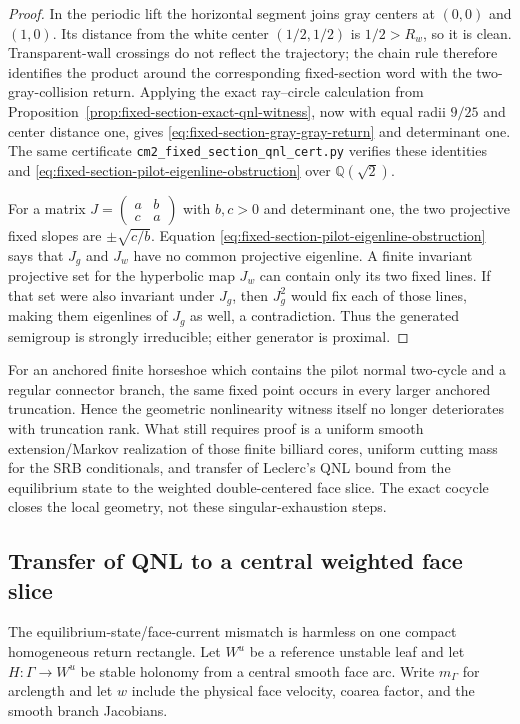 \documentclass[11pt]{article}
\begin{document}
\begin{proof}
In the periodic lift the horizontal segment joins gray centers at $(0,0)$
and $(1,0)$.  Its distance from the white center $(1/2,1/2)$ is $1/2>R_w$,
so it is clean.  Transparent-wall crossings do not reflect the trajectory;
the chain rule therefore identifies the product around the corresponding
fixed-section word with the two-gray-collision return.  Applying the exact
ray--circle calculation from
Proposition~\ref{prop:fixed-section-exact-qnl-witness}, now with equal radii
$9/25$ and center distance one, gives
\eqref{eq:fixed-section-gray-gray-return} and determinant one.  The same
certificate \texttt{cm2\_fixed\_section\_qnl\_cert.py} verifies these
identities and \eqref{eq:fixed-section-pilot-eigenline-obstruction} over
$\mathbb Q(\sqrt2)$.

For a matrix
$J=\left(\begin{smallmatrix}a&b\\c&a\end{smallmatrix}\right)$ with
$b,c>0$ and determinant one, the two projective fixed slopes are
$\pm\sqrt{c/b}$.  Equation
\eqref{eq:fixed-section-pilot-eigenline-obstruction} says that $J_g$ and
$J_w$ have no common projective eigenline.  A finite invariant projective
set for the hyperbolic map $J_w$ can contain only its two fixed lines.  If
that set were also invariant under $J_g$, then $J_g^2$ would fix each of
those lines, making them eigenlines of $J_g$ as well, a contradiction.
Thus the generated semigroup is strongly irreducible; either generator is
proximal.
\end{proof}

For an anchored finite horseshoe which contains the pilot normal two-cycle and a
regular connector branch, the same fixed point occurs in every larger
anchored truncation.  Hence the geometric nonlinearity witness itself no
longer deteriorates with truncation rank.  What still requires proof is a
uniform smooth extension/Markov realization of those finite billiard cores,
uniform cutting mass for the SRB conditionals, and transfer of Leclerc's QNL
bound from the equilibrium state to the weighted double-centered face slice.
The exact cocycle closes the local geometry, not these singular-exhaustion
steps.

\subsection{Transfer of QNL to a central weighted face slice}

The equilibrium-state/face-current mismatch is harmless on one compact
homogeneous return rectangle.  Let $W^u$ be a reference unstable leaf and let
$H:\Gamma\to W^u$ be stable holonomy from a central smooth face arc.  Write
$m_\Gamma$ for arclength and let $w$ include the physical face velocity,
coarea factor, and the smooth branch Jacobians.
\end{document}
